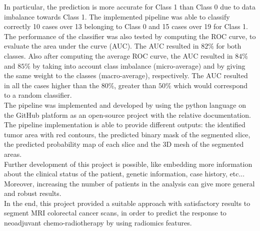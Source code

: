 \documentclass{standalone}
\begin{document}
In particular, the prediction is more accurate for Class 1 than Class 0 due to data imbalance towards Class 1.
The implemented pipeline was able to classify correctly 10 cases over 13 belonging to Class 0 and 
15 cases over 19 for Class 1.
\\
The performance of the classifier was also tested by computing the ROC curve, to evaluate the area under the curve (AUC).
The AUC resulted in $82 \%$ for both classes. 
Also after computing the average ROC curve, the AUC resulted in $84 \%$ and $85 \%$ by taking into account class imbalance (micro-average) and by giving the same weight to the classes (macro-average), respectively.
The AUC resulted in all the cases higher than the $80 \%$, greater than $50 \%$ which would correspond to a random classifier.
\\
The pipeline was implemented and developed by using the python language on the GitHub platform as an open-source project with the relative documentation.
The pipeline implementation is able to provide different outputs: the identified tumor area with red contours, the predicted binary mask of the segmented slice, the predicted probability map of each slice and the 3D mesh of the segmented areas.
\\
Further development of this project is possible, like embedding more information about the clinical status of the patient, genetic information, case history, etc... 
Moreover, increasing the number of patients in the analysis can give more general and robust results.
\\
In the end, this project provided a suitable approach with satisfactory results to segment MRI colorectal cancer scans, in order to predict the response to neoadjuvant chemo-radiotherapy by using radiomics features.
\end{document}
